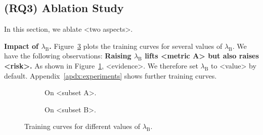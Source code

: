 \subsection{(RQ3) Ablation Study} \label{sec:ablation-study}
In this section, we ablate <two aspects>.

\textbf{Impact of $\lambda_{\text{B}}$.} Figure~\ref{fig:alpha} plots the training curves for several values of $\lambda_{\text{B}}$.
We have the following observations: \textbf{\draft{[Expected]} Raising $\lambda_{\text{B}}$ lifts <metric A> but also raises <risk>.}
As shown in Figure~\ref{fig:alpha-a}, <evidence>.
We therefore set $\lambda_{\text{B}}$ to <value> by default.
Appendix~\ref{apdx:experiments} shows further training curves.

\begin{figure}[t]
    \centering
    \begin{subfigure}[t]{0.49\columnwidth}
        \centering
        \caption{On <subset A>.}
        \label{fig:alpha-a}
    \end{subfigure}\hfill
    \begin{subfigure}[t]{0.49\columnwidth}
        \centering
        \caption{On <subset B>.}
        \label{fig:alpha-b}
    \end{subfigure}
    \caption{Training curves for different values of $\lambda_{\text{B}}$.}
    \label{fig:alpha}
    \vspace{-12pt}
\end{figure}
